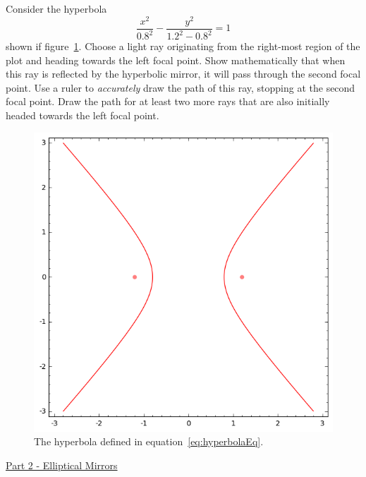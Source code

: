 Consider the hyperbola
%
\begin{equation}
\label{eq:hyperbolaEq}
\frac{x^2}{0.8^2} - \frac{y^2}{1.2^2 - 0.8^2} = 1
\end{equation}
%
shown if figure~\ref{fig:hyperbolaPlot}.
Choose a light ray originating from the right-most region of the plot and heading towards the left focal point.
Show mathematically that when this ray is reflected by the hyperbolic mirror, it will pass through the second focal point.
Use a ruler to \textit{accurately} draw the path of this ray, stopping at the second focal point.
Draw the path for at least two more rays that are also initially headed towards the left focal point.
%
\begin{figure}[!h]
\centering
\includegraphics[scale=0.85]{figures/optics-mirrors/hyperbolaPlot.png}
\caption{The hyperbola defined in equation~\ref{eq:hyperbolaEq}.}
\label{fig:hyperbolaPlot}
\end{figure}


\hfill \break
\underline{Part 2 - Elliptical Mirrors}
\hfill \break

